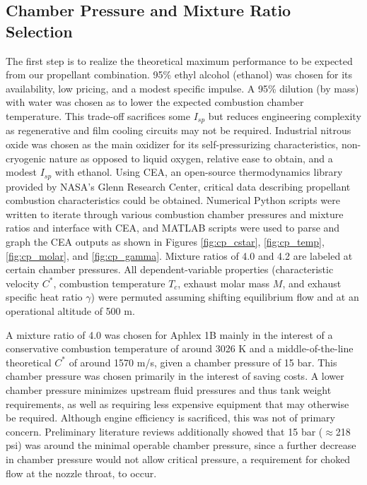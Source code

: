 \documentclass[9pt]{article} %
\numberwithin{equation}{section} %
\begin{document}
\subsection{Chamber Pressure and Mixture Ratio Selection}
\hspace{\parindent} The first step is to realize the theoretical maximum performance to be expected from our propellant combination.  95\% ethyl alcohol (ethanol) was chosen for its availability, low pricing, and a modest specific impulse. A 95\% dilution (by mass) with water was chosen as to lower the expected combustion chamber temperature. This trade-off sacrifices some $I_{sp}$ but reduces engineering complexity as regenerative and film cooling circuits may not be required. Industrial nitrous oxide was chosen as the main oxidizer for its self-pressurizing characteristics, non-cryogenic nature as opposed to liquid oxygen, relative ease to obtain, and a modest $I_{sp}$ with ethanol.
Using CEA, an open-source thermodynamics library provided by NASA's Glenn Research Center, critical data describing propellant combustion characteristics could be obtained. Numerical Python scripts were written to iterate through various combustion chamber pressures and mixture ratios and interface with CEA, and MATLAB scripts were used to parse and graph the CEA outputs as shown in Figures \ref{fig:cp_cstar}, \ref{fig:cp_temp}, \ref{fig:cp_molar}, and \ref{fig:cp_gamma}. Mixture ratios of 4.0 and 4.2 are labeled at certain chamber pressures. All dependent-variable properties (characteristic velocity $C^{*}$, combustion temperature $T_{c}$, exhaust molar mass $M$, and exhaust specific heat ratio $\gamma$) were permuted assuming shifting equilibrium flow and at an operational altitude of 500 m. 

A mixture ratio of 4.0 was chosen for Aphlex 1B mainly in the interest of a conservative combustion temperature of around 3026 K and a middle-of-the-line theoretical $C^{*}$ of around 1570 m/s, given a chamber pressure of 15 bar. This chamber pressure was chosen primarily in the interest of saving costs. A lower chamber pressure minimizes upstream fluid pressures and thus tank weight requirements, as well as requiring less expensive equipment that may otherwise be required. Although engine efficiency is sacrificed, this was not of primary concern. Preliminary literature reviews additionally showed that 15 bar ($\approx$218 psi) was around the minimal operable chamber pressure, since a further decrease in chamber pressure would not allow critical pressure, a requirement for choked flow at the nozzle throat, to occur.
\end{document}
